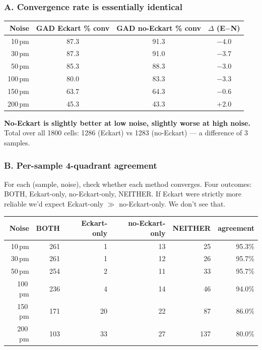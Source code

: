 \documentclass[11pt]{article}
\begin{document}
\subsubsection*{A. Convergence rate is essentially identical}

\begin{center}
\begin{tabular}{r|cc|c}
\toprule
Noise & GAD Eckart \% conv & GAD no-Eckart \% conv & $\Delta$ (E$-$N) \\
\midrule
10\,pm  & 87.3 & 91.3 & $-4.0$ \\
30\,pm  & 87.3 & 91.0 & $-3.7$ \\
50\,pm  & 85.3 & 88.3 & $-3.0$ \\
100\,pm & 80.0 & 83.3 & $-3.3$ \\
150\,pm & 63.7 & 64.3 & $-0.6$ \\
200\,pm & 45.3 & 43.3 & $+2.0$ \\
\bottomrule
\end{tabular}
\end{center}

\textbf{No-Eckart is slightly better at low noise, slightly worse at high noise.}
Total over all 1800 cells: 1286 (Eckart) vs 1283 (no-Eckart) — a difference
of 3 samples.

\subsubsection*{B. Per-sample 4-quadrant agreement}

For each (sample, noise), check whether each method converges. Four
outcomes: BOTH, Eckart-only, no-Eckart-only, NEITHER. If Eckart were
strictly more reliable we'd expect Eckart-only $\gg$ no-Eckart-only. We
don't see that.

\begin{center}
\begin{tabular}{rrrrrr}
\toprule
Noise & BOTH & Eckart-only & no-Eckart-only & NEITHER & agreement \\
\midrule
10\,pm  & 261 & 1  & 13 & 25  & 95.3\% \\
30\,pm  & 261 & 1  & 12 & 26  & 95.7\% \\
50\,pm  & 254 & 2  & 11 & 33  & 95.7\% \\
100\,pm & 236 & 4  & 14 & 46  & 94.0\% \\
150\,pm & 171 & 20 & 22 & 87  & 86.0\% \\
200\,pm & 103 & 33 & 27 & 137 & 80.0\% \\
\bottomrule
\end{tabular}
\end{center}
\end{document}
